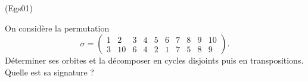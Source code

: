 \begin{tiny}(Egs01)\end{tiny}
On consid{\`e}re la permutation
\[
\sigma =
\begin{pmatrix}
1 & 2 & 3 & 4 & 5 & 6 & 7 & 8 & 9 & 10 \\
3 & 10 & 6 & 4 & 2 & 1 & 7 & 5 & 8 & 9
\end{pmatrix}.
\]
D{\'e}terminer ses orbites et la d{\'e}composer en cycles disjoints puis en
transpositions. Quelle est sa signature ?
